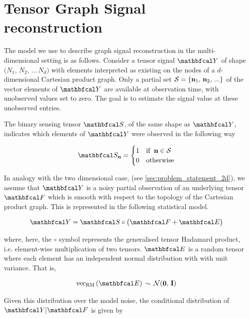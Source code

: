 \section{Tensor Graph Signal reconstruction}

\label{sec:tensor_gsr}

The model we use to describe graph signal reconstruction in the multi-dimensional setting is as follows. Consider a tensor signal $\Yt$ of shape $\big(N_1, \, N_2, \, ... \, N_d \big)$ with elements interpreted as existing on the nodes of a $d$-dimensional Cartesian product graph. Only a partial set $\mathcal{S} = \{\mathbf{n}_1, \, \mathbf{n}_2, \, ... \}$ of the vector elements of $\Yt$ are available at observation time, with unobserved values set to zero. The goal is to estimate the signal value at these unobserved entries. 

The binary sensing tensor $\St$, of the same shape as $\Yt$, indicates which elements of $\Yt$ were observed in the following way 

\begin{equation}
    \St_{\nn} = \begin{cases}
        1 & \text{if} \;\; \nn \in \mathcal{S} \\
        0 & \text{otherwise}
    \end{cases}
\end{equation}

In analogy with the two dimensional case, (see \cref{sec:problem_statement_2d}), we assume that $\Yt$ is a noisy partial observation of an underlying tensor $\Ft$ which is smooth with respect to the topology of the Cartesian product graph. This is represented in the following statistical model. 

\begin{equation}
    \Yt = \St \circ \big(\Ft + \Et \big)
\end{equation}

where, here, the $\circ$ symbol represents the generalised tensor Hadamard product, i.e. element-wise multiplication of two tensors. $\Et$ is a random tensor where each element has an independent normal distribution with with unit variance. That is,

\begin{equation}
    \vecrm{\Et} \, \sim \, \mathcal{N}(\mathbf{0}, \, \I)
\end{equation}

Given this distribution over the model noise, the conditional distribution of $\Yt |  \Ft$ is given by 

